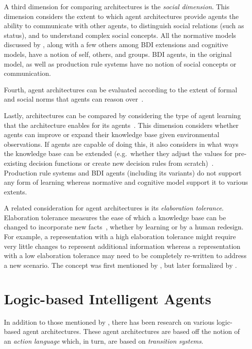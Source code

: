 A third dimension for comparing architectures is the \textit{social dimension}.
This dimension considers the extent to which agent architectures provide agents the ability to communicate with other agents, to distinguish social relations (such as status), and to understand complex social concepts.
All the normative models discussed by \citet{balke_how_2014}, along with a few others among BDI extensions and cognitive models, have a notion of self, others, and groups.
BDI agents, in the original model, as well as production rule systems have no notion of social concepts or communication.

Fourth, agent architectures can be evaluated according to the extent of formal and social norms that agents can reason over~\citep{balke_how_2014}.

Lastly, architectures can be compared by considering the type of agent learning that the architecture enables for its agents~\citep{balke_how_2014}.
This dimension considers whether agents can improve or expand their knowledge base given environmental observations.
If agents are capable of doing this, it also considers in what ways the knowledge base can be extended (e.g.~whether they adjust the values for pre-existing decision functions or create new decision rules from scratch)~\citep{balke_how_2014}.
Production rule systems and BDI agents (including its variants) do not support any form of learning whereas normative and cognitive model support it to various extents.

A related consideration for agent architectures is its \textit{elaboration tolerance}.
Elaboration tolerance measures the ease of which a knowledge base can be changed to incorporate new facts~\citep{parmar_formalizing_2003}, whether by learning or by a human redesign.
For example, a representation with a high elaboration tolerance might require very little changes to represent additional information whereas a representation with a low elaboration tolerance may need to be completely re-written to address a new scenario.
The concept was first mentioned by \citet{mccarthy_mathematical_1988}, but later formalized by \citet{parmar_formalizing_2003}.

\section{Logic-based Intelligent Agents}
\label{sec:logic_based_agents}

In addition to those mentioned by \citet{balke_how_2014}, there has been research on various logic-based agent architectures.
These agent architectures are based off the notion of an \textit{action language} which, in turn, are based on \textit{transition systems}.

